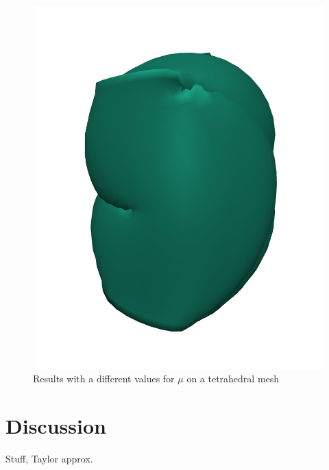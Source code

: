 \begin{figure}[!ht]
\centering
\includegraphics[width=.7\textwidth]{resources/mu_extreme_small.png}  
\caption{Results with a different values for $\mu$ on a tetrahedral mesh}
\label{fig:mu_extreme}
\end{figure}


\newpage

\section{Discussion}
Stuff, Taylor approx.



